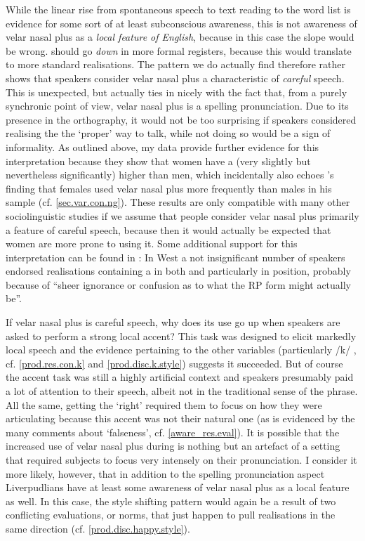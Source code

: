 While the linear rise from spontaneous speech to text reading to the word list is evidence for some sort of at least subconscious awareness, this is not awareness of velar nasal plus as a \emph{local feature of  English}, because in this case the slope would be wrong.
 should go \emph{down} in more formal registers, because this would translate to more standard realisations.
The pattern we do actually find therefore rather shows that speakers consider velar nasal plus a characteristic of \emph{careful} speech.
This is unexpected, but actually ties in nicely with the fact that, from a purely synchronic point of view, velar nasal plus is a spelling pronunciation.
Due to its presence in the orthography, it would not be too surprising if speakers considered realising the  the `proper' way to talk, while not doing so would be a sign of informality.
As outlined above, my data provide further evidence for this interpretation because they show that women have a (very slightly but nevertheless significantly) higher  than men, which incidentally also echoes \textcite{knowles1973}'s finding that females used velar nasal plus more frequently than males in his sample (cf. \ref{sec.var.con.ng}).
These results are only compatible with many other sociolinguistic studies if we assume that people consider velar nasal plus primarily a feature of careful speech, because then it would actually be expected that women are more prone to using it.
Some additional support for this interpretation can be found in \textcite[cf.][101]{newbrook1999}: In West  a not insignificant number of speakers endorsed realisations containing a  in both  and particularly in  position, probably because of ``sheer ignorance or confusion as to what the RP form might actually be''.

If velar nasal plus is careful speech, why does its use go up when speakers are asked to perform a strong local accent?
This task was designed to elicit markedly local speech and the evidence pertaining to the other variables (particularly /k/ , cf. \ref{prod.res.con.k} and \ref{prod.disc.k.style}) suggests it succeeded.
But of course the accent  task was still a highly artificial context and speakers presumably paid a lot of attention to their speech, albeit not in the traditional  sense of the phrase.
All the same, getting the  `right' required them to focus on how they were articulating because this  accent was not their natural one (as is evidenced by the many comments about `falseness', cf. \ref{aware_res.eval}).
It is possible that the increased use of velar nasal plus during  is nothing but an artefact of a setting that required subjects to focus very intensely on their pronunciation.
I consider it more likely, however, that in addition to the spelling pronunciation aspect Liverpudlians have at least some awareness of velar nasal plus as a local feature as well.
In this case, the style shifting pattern would again be a result of two conflicting evaluations, or norms, that just happen to pull realisations in the same direction (cf. \ref{prod.disc.happy.style}).

